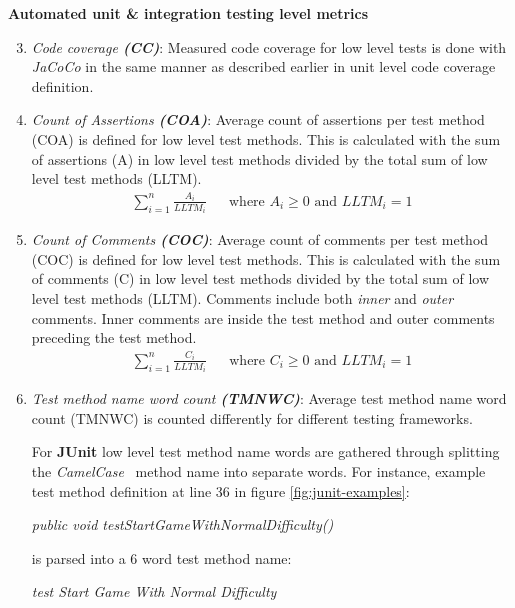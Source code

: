     \begin{addmargin}[0em]{0em}
    \vspace{10px}
    \textbf{Automated unit \& integration testing level metrics}
    \vspace{5px}
    \newline
    \begin{enumerate}
    \setcounter{enumi}{2}
    \item \textit{Code coverage \textbf{(CC)}}:
    Measured code coverage for low level tests is done with \textit{JaCoCo} in the same manner as described earlier in
    unit level code coverage definition.

    \item \textit{Count of Assertions \textbf{(COA)}}:
    Average count of assertions per test method (COA) is defined for low level test methods. This is calculated with
    the sum of assertions (A) in low level test methods divided by the total sum of low level test methods (LLTM).
    \begin{align*}
        \sum_{i=1}^{n}\frac{A_{i}}{LLTM_{i}} && \text {where } A_{i} \geq 0 \text{ and } LLTM_{i} = 1
    \end{align*}

    \item \textit{Count of Comments \textbf{(COC)}}:
    Average count of comments per test method (COC) is defined for low level test methods. This is calculated with the
    sum of comments (C) in low level test methods divided by the total sum of low level test methods (LLTM). Comments include both
    \textit{inner} and \textit{outer} comments. Inner comments are inside the test method and outer comments preceding the test method.
    \begin{align*}
        \sum_{i=1}^{n}\frac{C_{i}}{LLTM_{i}} && \text {where } C_{i} \geq 0 \text{ and } LLTM_{i} = 1
    \end{align*}

    \item \textit{Test method name word count \textbf{(TMNWC)}}:
    Average test method name word count (TMNWC) is counted differently for different testing frameworks.

    For \textbf{JUnit} low level test method name words are gathered through splitting the \textit{CamelCase}~\cite{wiki:camelcase}
    method name into separate words. For instance, example test method definition at line 36 in figure \ref{fig:junit-examples}:


    \begin{addmargin}[0em]{0em}
    \vspace{10px}
    \textit{public void testStartGameWithNormalDifficulty()}
    \newline
    \end{addmargin}
    is parsed into a 6 word test method name:
    \begin{addmargin}[0em]{0em}
    \vspace{10px}
    \textit{test Start Game With Normal Difficulty}
    \newline
    \end{addmargin}


\end{enumerate}
\end{addmargin}
